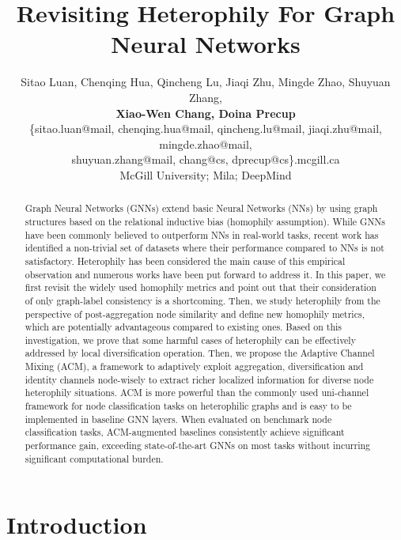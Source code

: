 \documentclass{article}
\title{Revisiting Heterophily For Graph Neural Networks}
\author{
Sitao Luan, Chenqing Hua, Qincheng Lu, Jiaqi Zhu, Mingde Zhao, Shuyuan Zhang,\\\textbf{Xiao-Wen Chang, Doina Precup}\\
\{sitao.luan@mail, chenqing.hua@mail, qincheng.lu@mail, jiaqi.zhu@mail, mingde.zhao@mail,\\
shuyuan.zhang@mail, chang@cs, dprecup@cs\}.mcgill.ca\\
McGill University; Mila; DeepMind\\

}
\newcommand{\0}{{\boldsymbol{0}}}
\newcommand{\6}{{\partial}}
\newcommand{\8}{{\infty}}
\newcommand{\4}{{\nabla}}
\begin{document}
\maketitle

\vspace{-0.3cm}
\begin{abstract}
Graph Neural Networks (GNNs) extend basic Neural Networks (NNs) by using graph structures based on the relational inductive bias (homophily assumption). While GNNs have been commonly believed to outperform NNs in real-world tasks, recent work has identified a non-trivial set of datasets where their performance compared to NNs is not satisfactory. Heterophily has been considered the main cause of this empirical observation and numerous works have been put forward to address it. In this paper, we first revisit the widely used homophily metrics and point out that their consideration of only graph-label consistency is a shortcoming. Then, we study heterophily from the  perspective of post-aggregation node similarity and define new homophily metrics, which are potentially advantageous compared to existing ones. Based on this investigation, we prove that some harmful cases of heterophily can be effectively addressed by local diversification operation. Then, we propose the Adaptive Channel Mixing (ACM), a framework to adaptively exploit aggregation, diversification and identity channels node-wisely to extract richer localized information for diverse node heterophily situations. ACM is more powerful than the commonly used uni-channel framework for node classification tasks on heterophilic graphs and is easy to be implemented in baseline GNN layers. When evaluated on  benchmark node classification tasks, ACM-augmented baselines consistently achieve significant performance gain, exceeding state-of-the-art GNNs on most  tasks without incurring significant computational burden.
\end{abstract}

\vspace{-0.3cm}
\section{Introduction}
\vspace{-0.3cm}
\label{sec:introduction}
\end{document}
